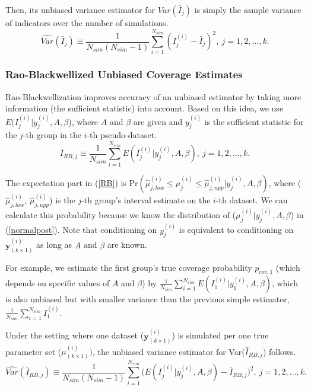 \documentclass[article]{jss}
\begin{document}
Then, its unbiased variance estimator  for $Var(\bar{I}_{j})$ is simply the sample variance of indicators over the number of simulations.
\begin{equation}\label{svar}
\widehat{Var}(\bar{I}_{j})\equiv\frac{1}{N_{sim}(N_{sim}-1)}\sum_{i=1}^{N_{sim}}(I^{(i)}_{j}-\bar{I}_{j})^{2},~ j=1, 2, \ldots, k.
\end{equation}


\subsubsection{Rao-Blackwellized Unbiased Coverage Estimates}
Rao-Blackwellization improves accuracy of an unbiased estimator by taking more information (the sufficient statistic) into account. Based on this idea, we use $E(I^{(i)}_{j}\vert y^{(i)}_{j}, A, \beta$), where $A$ and $\beta$ are given and $y^{(i)}_{j}$ is the sufficient statistic for the $j$-th group in the $i$-th pseudo-dataset. 
\begin{equation}\label{RB}
\bar{I}_{RB, j}\equiv \frac{1}{N_{sim}}\sum_{i=1}^{N_{sim}}E(I^{(i)}_{j}\vert y^{(i)}_{j}, A, \beta),~ j=1, 2, \ldots, k.
\end{equation}

The expectation part in (\ref{RB}) is Pr$(\hat{\mu}^{(i)}_{j, low}\le \mu^{(i)}_{j} \le\hat{\mu}^{(i)}_{j, upp}\vert y^{(i)}_{j}, A, \beta)$, where ($\hat{\mu}^{(i)}_{j, low}$, $\hat{\mu}^{(i)}_{j, upp}$) is the $j$-th group's interval estimate on the $i$-th dataset. We can calculate this probability  because we know the distribution of ($\mu^{(i)}_{j} \vert y^{(i)}_{j}, A, \beta$) in (\ref{normalpost}). Note that conditioning on $y^{(i)}_{j}$ is equivalent to conditioning on $\mathbf{y}^{(i)}_{(k\times1)}$ as long as $A$ and $\beta$ are known. 

For example, we estimate the first group's true coverage probability $p_{cov, 1}$ (which depends on specific values of $A$ and $\beta$) by $\frac{1}{N_{sim}}\sum_{i=1}^{N_{sim}}E(I^{(i)}_{1}\vert y^{(i)}_{1}, A, \beta)$, which is also unbiased but with smaller variance than the previous simple estimator, $\frac{1}{N_{sim}}\sum_{i=1}^{N_{sim}}I^{(i)}_{1}$.

Under the setting where one dataset ($\mathbf{y}^{(i)}_{(k\times1)}$) is simulated per one true parameter set ({\boldmath $\mu$}$^{(i)}_{(k\times1)})$, the unbiased variance estimator for Var($\bar{I}_{RB, j}$) follows.
\begin{equation}\label{RBvar}
\widehat{Var}(\bar{I}_{RB, j})\equiv\frac{1}{N_{sim}(N_{sim}-1)}\sum_{i=1}^{N_{sim}}\bigg(E(I^{(i)}_{j}\vert y^{(i)}_{j}, A, \beta)-\bar{I}_{RB, j}\bigg)^{2},~ j=1, 2, \ldots, k.
\end{equation}
\end{document}

